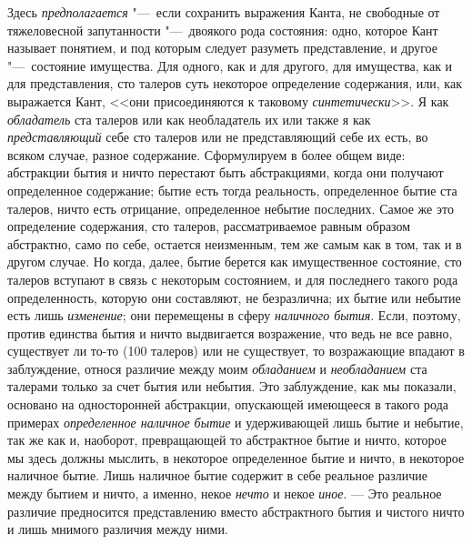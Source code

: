 Здесь {\em предполагается} "---~если сохранить выражения
Канта, не свободные от тяжеловесной запутанности "---~двоякого рода состояния:
одно, которое Кант называет понятием, и под которым следует разуметь
представление, и другое "---~состояние имущества. Для одного, как и для
другого, для имущества, как и для представления, сто талеров суть некоторое
определение содержания, или, как выражается Кант, <<они присоединяются к
таковому {\em синтетически}>>. Я как
{\em обладатель} ста талеров или как необладатель их
или также я как {\em представляющий} себе сто талеров
или не представляющий себе их есть, во всяком случае, разное содержание.
Сформулируем в более общем виде: абстракции бытия и ничто перестают быть
абстракциями, когда они получают определенное содержание; бытие есть тогда
реальность, определенное бытие ста талеров, ничто есть отрицание,
определенное небытие последних. Самое же это определение содержания, сто
талеров, рассматриваемое равным образом абстрактно, само по себе, остается
неизменным, тем же самым как в том, так и в другом случае. Но когда, далее,
бытие берется как имущественное состояние, сто талеров вступают в связь с
некоторым состоянием, и для последнего такого рода определенность, которую
они составляют, не безразлична; их бытие или небытие есть лишь
{\em изменение}; они перемещены в сферу
{\em наличного бытия}. Если, поэтому, против единства
бытия и ничто выдвигается возражение, что ведь не все равно, существует ли
то-то (100 талеров) или не существует, то возражающие впадают в
заблуждение, относя различие между моим
{\em обладанием} и
{\em необладанием} ста талерами только за счет бытия
или небытия. Это заблуждение, как мы показали, основано на односторонней
абстракции, опускающей имеющееся в такого рода примерах
{\em определенное наличное бытие} и удерживающей лишь
бытие и небытие, так же как и, наоборот, превращающей то абстрактное бытие
и ничто, которое мы здесь должны мыслить, в некоторое определенное бытие и
ничто, в некоторое наличное бытие. Лишь наличное бытие содержит в себе
реальное различие между бытием и ничто, а именно, некое
{\em нечто} и некое {\em иное}. --- Это реальное различие предносится
представлению вместо абстрактного бытия и
чистого ничто и лишь мнимого различия между ними.

